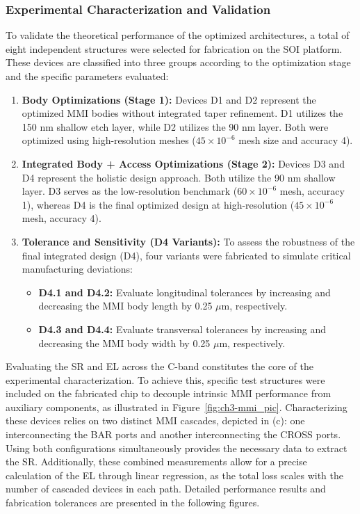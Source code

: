 \subsubsection{Experimental Characterization and Validation}

To validate the theoretical performance of the optimized architectures, a total of eight 
independent structures were selected for fabrication on the SOI platform. These devices are 
classified into three groups according to the optimization stage and the specific parameters 
evaluated:

\begin{enumerate}
    \item \textbf{Body Optimizations (Stage 1):} Devices D1 and D2 represent the optimized MMI 
    bodies without integrated taper refinement. D1 utilizes the 150 nm     shallow etch layer, 
    while D2 utilizes the 90 nm layer. Both were optimized using high-resolution meshes 
    ($45 \times 10^{-6}$ mesh size and accuracy 4).
    \item \textbf{Integrated Body + Access Optimizations (Stage 2):} Devices D3 and D4 represent 
    the holistic design approach. Both utilize the 90 nm shallow layer. D3 serves as the 
    low-resolution benchmark ($60 \times 10^{-6}$ mesh, accuracy 1), whereas D4 is the final 
    optimized design at high-resolution ($45 \times 10^{-6}$ mesh, accuracy 4).
    \item \textbf{Tolerance and Sensitivity (D4 Variants):} To assess the robustness of the final 
    integrated design (D4), four variants were fabricated to simulate critical manufacturing 
    deviations:
    \begin{itemize}
        \item \textbf{D4.1 and D4.2:} Evaluate longitudinal tolerances by increasing and decreasing 
        the MMI body length by 0.25 $\mu$m, respectively.
        \item \textbf{D4.3 and D4.4:} Evaluate transversal tolerances by increasing and decreasing 
        the MMI body width by 0.25 $\mu$m, respectively.
    \end{itemize}
\end{enumerate}

Evaluating the SR and EL across the C-band constitutes the core of the experimental 
characterization. To achieve this, specific test structures were included on the fabricated chip 
to decouple intrinsic MMI performance from auxiliary components, as illustrated in 
Figure~\ref{fig:ch3-mmi_pic}. Characterizing these devices relies on two distinct MMI cascades, 
depicted in (c): one interconnecting the BAR ports and another interconnecting the CROSS ports. 
Using both configurations simultaneously provides the necessary data to extract the SR. 
Additionally, these combined measurements allow for a precise calculation of the EL through linear 
regression, as the total loss scales with the number of cascaded devices in each path. Detailed 
performance results and fabrication tolerances are presented in the following figures.

